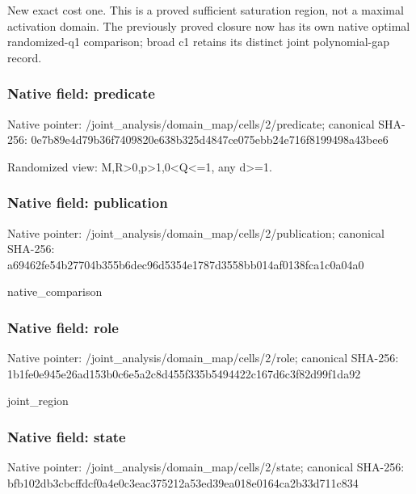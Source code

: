 \documentclass[10pt,a4paper]{article}
\begin{document}
\begingroup\raggedright\sloppy New exact cost one. This is a proved sufficient saturation region,\allowbreak{} not a maximal activation domain. The previously proved closure now has its own native optimal randomized-q1 comparison;\allowbreak{} broad c1 retains its distinct joint polynomial-gap record.\par\endgroup

\subsubsection{Native field: predicate}
Native pointer: /joint\_\allowbreak{}analysis/domain\_\allowbreak{}map/cells/2/predicate; canonical SHA-256: 0e7b89e4d79b36f7409820e638b325d4847ce075ebb24e716f8199498a43bee6

\begingroup\raggedright\sloppy Randomized view:\allowbreak{} M,\allowbreak{}R>0,\allowbreak{}p>1,\allowbreak{}0<Q<=\allowbreak{}1,\allowbreak{} any d>=\allowbreak{}1.\par\endgroup

\subsubsection{Native field: publication}
Native pointer: /joint\_\allowbreak{}analysis/domain\_\allowbreak{}map/cells/2/publication; canonical SHA-256: a69462fe54b27704b355b6dec96d5354e1787d3558bb014af0138fca1c0a04a0

\begingroup\raggedright\sloppy native\_\allowbreak{}comparison\par\endgroup

\subsubsection{Native field: role}
Native pointer: /joint\_\allowbreak{}analysis/domain\_\allowbreak{}map/cells/2/role; canonical SHA-256: 1b1fe0e945e26ad153b0c6e5a2c8d455f335b5494422c167d6c3f82d99f1da92

\begingroup\raggedright\sloppy joint\_\allowbreak{}region\par\endgroup

\subsubsection{Native field: state}
Native pointer: /joint\_\allowbreak{}analysis/domain\_\allowbreak{}map/cells/2/state; canonical SHA-256: bfb102db3cbcffdcf0a4e0c3eac375212a53ed39ea018e0164ca2b33d711c834
\end{document}
